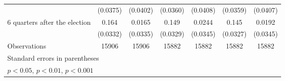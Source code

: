 \begin{table}[htbp]
\begin{tabular}{l*{6}{c}}
                    &    (0.0375)         &    (0.0402)         &    (0.0360)         &    (0.0408)         &    (0.0359)         &    (0.0407)         \\
[1em]
 6 quarters after the election&       0.164\sym{***}&      0.0165         &       0.149\sym{***}&      0.0244         &       0.145\sym{***}&      0.0192         \\
                    &    (0.0332)         &    (0.0335)         &    (0.0329)         &    (0.0345)         &    (0.0327)         &    (0.0345)         \\
\hline
Observations        &       15906         &       15906         &       15882         &       15882         &       15882         &       15882         \\
\hline\hline
\multicolumn{7}{l}{\footnotesize Standard errors in parentheses}\\
\multicolumn{7}{l}{\footnotesize \sym{*} \(p<0.05\), \sym{**} \(p<0.01\), \sym{***} \(p<0.001\)}\\
\end{tabular}
\end{table}
